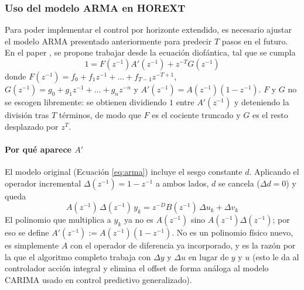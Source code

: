 \subsubsection{Uso del modelo ARMA en HOREXT}

Para poder implementar el control por horizonte extendido, es necesario ajustar el modelo ARMA presentado anteriormente para predecir $T$ pasos en el futuro. En el paper \cite{ydstie1985extended}, se propone trabajar desde la ecuación diofántica, tal que se cumpla
\begin{equation}
  1 = F(z^{-1})A'(z^{-1}) + z^{-T}G(z^{-1})
  \label{dino}
\end{equation}
donde $F(z^{-1}) = f_0 + f_1z^{-1} + \dots + f_{T-1}z^{-T+1}$, $G(z^{-1}) = g_0 + g_1z^{-1} + \dots + g_{n}z^{-n}$ y $A'(z^{-1}) = A(z^{-1})(1 - z^{-1})$. $F$ y $G$ no se escogen libremente: se obtienen dividiendo $1$ entre $A'(z^{-1})$ y deteniendo la división tras $T$ términos, de modo que $F$ es el cociente truncado y $G$ es el resto desplazado por $z^{T}$.

\paragraph{Por qué aparece $A'$}
El modelo original (Ecuación \ref{eq:arma}) incluye el sesgo constante $d$. Aplicando el operador incremental $\Delta(z^{-1}) = 1 - z^{-1}$ a ambos lados, $d$ se cancela ($\Delta d = 0$) y queda
\begin{equation}
  A(z^{-1})\,\Delta(z^{-1})\,y_k = z^{-D}B(z^{-1})\,\Delta u_k + \Delta v_k
  \label{eq:arma-delta}
\end{equation}
El polinomio que multiplica a $y_k$ ya no es $A(z^{-1})$ sino $A(z^{-1})\Delta(z^{-1})$; por eso se define $A'(z^{-1}) := A(z^{-1})(1-z^{-1})$. No es un polinomio físico nuevo, es simplemente $A$ con el operador de diferencia ya incorporado, y es la razón por la que el algoritmo completo trabaja con $\Delta y$ y $\Delta u$ en lugar de $y$ y $u$ (esto le da al controlador acción integral y elimina el offset de forma análoga al modelo CARIMA usado en control predictivo generalizado).

